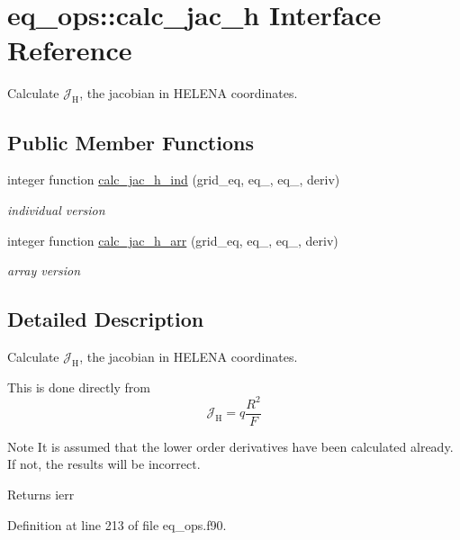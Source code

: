 \hypertarget{interfaceeq__ops_1_1calc__jac__h}{}\section{eq\+\_\+ops\+:\+:calc\+\_\+jac\+\_\+h Interface Reference}
\label{interfaceeq__ops_1_1calc__jac__h}


Calculate $\mathcal{J}_\text{H}$, the jacobian in H\+E\+L\+E\+NA coordinates.  


\subsection*{Public Member Functions}
\begin{DoxyCompactItemize}
\item 
integer function \hyperlink{interfaceeq__ops_1_1calc__jac__h_a1976fc12059af2b0da37445710dbfa68}{calc\+\_\+jac\+\_\+h\+\_\+ind} (grid\+\_\+eq, eq\+\_, eq\+\_, deriv)
\begin{DoxyCompactList}\small\item\em individual version \end{DoxyCompactList}\item 
integer function \hyperlink{interfaceeq__ops_1_1calc__jac__h_a737e7b3869d5b4e8f75ba8c704a10509}{calc\+\_\+jac\+\_\+h\+\_\+arr} (grid\+\_\+eq, eq\+\_, eq\+\_, deriv)
\begin{DoxyCompactList}\small\item\em array version \end{DoxyCompactList}\end{DoxyCompactItemize}


\subsection{Detailed Description}
Calculate $\mathcal{J}_\text{H}$, the jacobian in H\+E\+L\+E\+NA coordinates. 

This is done directly from \[\mathcal{J}_\text{H} = q \frac{R^2}{F} \]

\begin{DoxyNote}{Note}
It is assumed that the lower order derivatives have been calculated already. If not, the results will be incorrect.
\end{DoxyNote}
\begin{DoxyReturn}{Returns}
ierr 
\end{DoxyReturn}


Definition at line 213 of file eq\+\_\+ops.\+f90.



